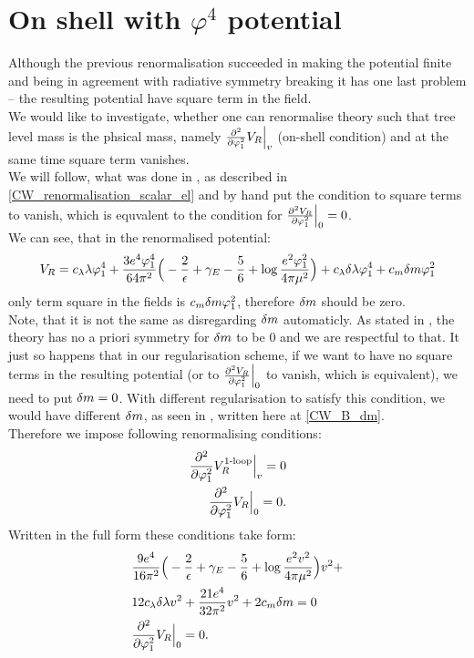 \section{On shell with $\varphi^4$ potential}\label{onshellphi4}
Although the previous renormalisation succeeded in making the potential finite and being in 
agreement with radiative symmetry breaking it has one last problem -- the resulting potential have 
square term in the field. \\
We would like to investigate, whether one can renormalise theory such that tree 
level mass is the phsical mass, namely $\frac{\partial^2 }{\partial \varphi_1^2}V_R\Big|_{v}$ (on-shell condition) and at the 
same time square term vanishes. \\
We will follow, what was done in \cite{Coleman1973}, as described in 
\ref{CW_renormalisation_scalar_el} and by hand put the condition to square terms to vanish, 
which is equvalent to the condition for $\frac{\partial^2 V_R}{\partial \varphi_1^2}\Big|_{0} = 0$. \\
We can see, that in the renormalised potential:
\begin{align}
V_R = c_\lambda\lambda\varphi_1^4 + \frac{3e^4\varphi_1^4}{64\pi^2}\Big(-\frac{2}{\epsilon}+\gamma_E- 
\frac{5}{6}+
\log{\frac{e^2\varphi_1^2}{4\pi\mu^2}}\Big) + c_\lambda\delta\lambda\varphi_1^4+c_m\delta m\varphi_1^2
\end{align}
only term square in the fields is $c_m\delta m\varphi_1^2$, therefore $\delta m$ should be zero. \\
Note, that it is not the same as disregarding $\delta m$ automaticly. As stated in \cite{Coleman1973}, 
the theory has no a priori symmetry for $\delta m$ to be $0$ and we are respectful to that. 
It just so happens that in our regularisation scheme, if we want to have no square terms in the 
resulting potential (or to $\frac{\partial^2 V_R}{\partial \varphi_1^2}\Big|_{0}$ to vanish, which is equivalent), we need to put 
$\delta m = 0$. With different regularisation to satisfy this condition, we would have different $\delta m$, 
as seen in \cite{Coleman1973}, written here at \ref{CW_B_dm}. \\
Therefore we impose following renormalising conditions:
\begin{align}
\frac{\partial^2 }{\partial \varphi_1^2}V_R^{\textrm{1-loop}}\Big|_{v}=0 \\
\frac{\partial^2 }{\partial \varphi_1^2}V_R\Big|_{0}=0.
\end{align}
Written in the full form these conditions take form:
\begin{align}
&\frac{9e^4}{16\pi^2}\Big(-\frac{2}{\epsilon}+\gamma_E-\frac{5}{6}+\log\frac{e^2
v^2}{4\pi\mu^2}\Big)v^2+ \notag\\
& 12c_\lambda\delta\lambda v^2+\frac{21e^4}{32\pi^2}v^2+2c_m\delta m = 0 \\
&\frac{\partial^2 }{\partial \varphi_1^2}V_R\Big|_{0} = 0.
\end{align}
